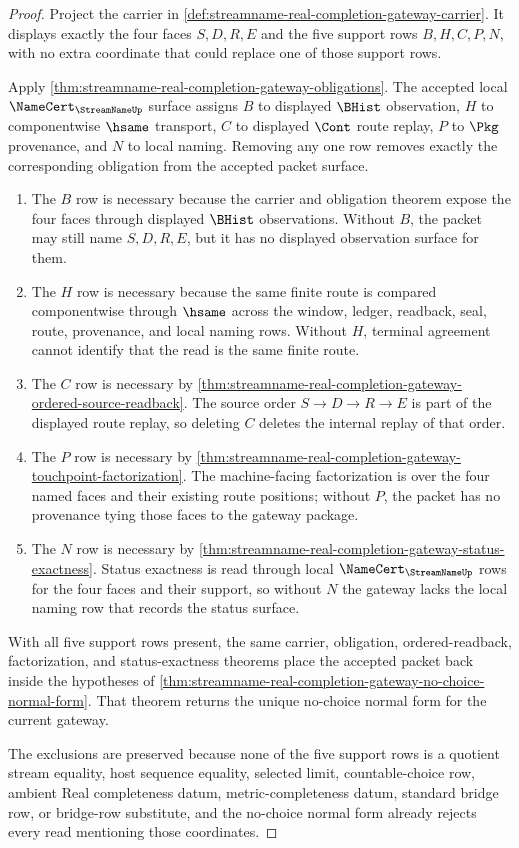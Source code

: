 \begin{proof}
Project the carrier in \autoref{def:streamname-real-completion-gateway-carrier}. It displays exactly the four faces $S,D,R,E$ and the five support rows $B,H,C,P,N$, with no extra coordinate that could replace one of those support rows.

Apply \autoref{thm:streamname-real-completion-gateway-obligations}. The accepted local $\NameCert_{\StreamNameUp}$ surface assigns $B$ to displayed $\BHist$ observation, $H$ to componentwise $\hsame$ transport, $C$ to displayed $\Cont$ route replay, $P$ to $\Pkg$ provenance, and $N$ to local naming. Removing any one row removes exactly the corresponding obligation from the accepted packet surface.

\begin{enumerate}
\item The $B$ row is necessary because the carrier and obligation theorem expose the four faces through displayed $\BHist$ observations. Without $B$, the packet may still name $S,D,R,E$, but it has no displayed observation surface for them.
\item The $H$ row is necessary because the same finite route is compared componentwise through $\hsame$ across the window, ledger, readback, seal, route, provenance, and local naming rows. Without $H$, terminal agreement cannot identify that the read is the same finite route.
\item The $C$ row is necessary by \autoref{thm:streamname-real-completion-gateway-ordered-source-readback}. The source order $S \longrightarrow D \longrightarrow R \longrightarrow E$ is part of the displayed route replay, so deleting $C$ deletes the internal replay of that order.
\item The $P$ row is necessary by \autoref{thm:streamname-real-completion-gateway-touchpoint-factorization}. The machine-facing factorization is over the four named faces and their existing route positions; without $P$, the packet has no provenance tying those faces to the gateway package.
\item The $N$ row is necessary by \autoref{thm:streamname-real-completion-gateway-status-exactness}. Status exactness is read through local $\NameCert_{\StreamNameUp}$ rows for the four faces and their support, so without $N$ the gateway lacks the local naming row that records the status surface.
\end{enumerate}

With all five support rows present, the same carrier, obligation, ordered-readback, factorization, and status-exactness theorems place the accepted packet back inside the hypotheses of \autoref{thm:streamname-real-completion-gateway-no-choice-normal-form}. That theorem returns the unique no-choice normal form for the current gateway.

The exclusions are preserved because none of the five support rows is a quotient stream equality, host sequence equality, selected limit, countable-choice row, ambient Real completeness datum, metric-completeness datum, standard bridge row, or bridge-row substitute, and the no-choice normal form already rejects every read mentioning those coordinates.
\end{proof}

